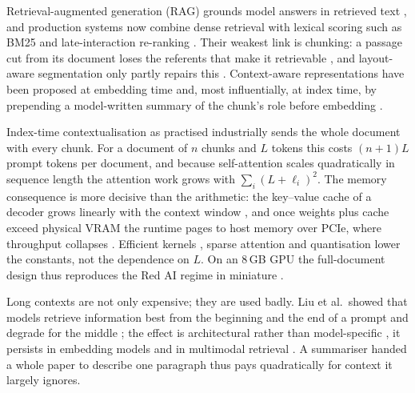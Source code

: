 \documentclass[pdflatex,sn-mathphys-num]{sn-jnl}
\theoremstyle{thmstyleone}%
\theoremstyle{thmstylethree}%
\begin{document}
Retrieval-augmented generation (RAG) grounds model answers in retrieved text \cite{lewisetal2021,info16090766,ram2023incontext}, and production systems now combine dense retrieval \cite{karpukhin2020dpr} with lexical scoring such as BM25 \cite{robertson1995okapi,robertson2009bm25} and late-interaction re-ranking \cite{khattab2020colbert,santhanam2022colbertv2,kiran2025hybrid,wang2024searching}. Their weakest link is chunking: a passage cut from its document loses the referents that make it retrievable \cite{merola2025reconstructingcontextevaluatingadvanced,smith2024evaluating,qu2024semanticchunkingworthcomputational,chen2023densex}, and layout-aware segmentation only partly repairs this \cite{auer2024doclingtechnicalreport,verma2025s2chunkinghybridframework}. Context-aware representations have been proposed at embedding time \cite{gunther2024latechunking} and, most influentially, at index time, by prepending a model-written summary of the chunk's role before embedding \cite{anthropic2024contextual}.

Index-time contextualisation as practised industrially sends the whole document with every chunk. For a document of $n$ chunks and $L$ tokens this costs $(n+1)L$ prompt tokens per document, and because self-attention scales quadratically in sequence length \cite{vaswani2017attention,tay2022efficient,kaplan2020scaling} the attention work grows with $\sum_i (L+\ell_i)^2$. The memory consequence is more decisive than the arithmetic: the key--value cache of a decoder grows linearly with the context window \cite{pope2023efficiently,kwon2023vllm,ainslie2023gqa}, and once weights plus cache exceed physical VRAM the runtime pages to host memory over PCIe, where throughput collapses \cite{sheng2023flexgen}. Efficient kernels \cite{dao2022flashattention}, sparse attention \cite{beltagy2020longformer} and quantisation \cite{jacob2018quantization} lower the constants, not the dependence on $L$. On an 8\,GB GPU the full-document design thus reproduces the Red AI regime in miniature \cite{shen2024RAGDesignTradeoffs,zhao2025RAGDesignDecisions,samsi2023words}.

Long contexts are not only expensive; they are used badly. Liu et al.\ showed that models retrieve information best from the beginning and the end of a prompt and degrade for the middle \cite{liu2023lostmiddlelanguagemodels}; the effect is architectural rather than model-specific \cite{guo2024serialpositioneffectslarge,menschikov2025earlytokenbiasmodelspecificlanguagespecific,hsieh2024found}, it persists in embedding models \cite{lee2025quantifyingpositionalbiasestext} and in multimodal retrieval \cite{yao2025spotlighthiddenbiasundermining}. A summariser handed a whole paper to describe one paragraph thus pays quadratically for context it largely ignores.
\end{document}
